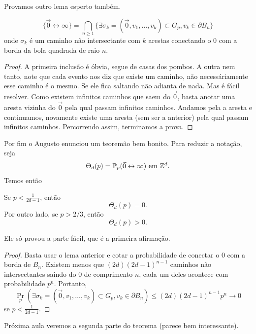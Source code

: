 Provamos outro lema esperto também.
\begin{lemma}
	\[
		\{\vec{0} \leftrightarrow \infty\} = \bigcap_{n\geq1} \{\exists
		\sigma_k = (\vec{0}, v_1, \dots, v_k) \subset G_p, v_k \in \partial B_n\}
	\]
	onde $\sigma_k$ é um caminho não intersectante com $k$
	arestas conectando o $0$ com a borda da bola quadrada de
	raio $n$.
\end{lemma}

\begin{proof}
	A primeira inclusão é óbvia, segue de casas dos pombos. A outra nem tanto,
	note que cada evento nos diz que existe um caminho, não
	necessáriamente esse caminho
	é o mesmo. Se ele fica saltando não adianta de nada. Mas é fácil
	resolver. Como existem
	infinitos caminhos que saem do $\vec{0}$, basta anotar uma aresta
	vizinha do $\vec{0}$ pela qual passam
	infinitos caminhos. Andamos pela a aresta e continuamos, novamente
	existe uma aresta (sem ser a anterior) pela
	qual passam infinitos caminhos. Percorrendo assim, terminamos a prova.
\end{proof}

Por fim o Augusto enunciou um teoremão bem bonito. Para reduzir a notação,
seja
\[
	\Theta_d(p) = \mathbb{P}_p(\vec{0} \leftrightarrow \infty) \text{ em } \mathbb{Z}^d.
\]
Temos então
\begin{theorem}
	\label{trm:bounds_for_pc}
	Se $p < \frac{1}{2d - 1}$, então
	\[\Theta_d(p) = 0.\]
	Por outro lado, se $p > 2/3$, então
	\[\Theta_d(p) > 0.\]
\end{theorem}
Ele só provou a parte fácil, que é a primeira afirmação.
\begin{proof}
	Basta usar o lema anterior e cotar a probabilidade de conectar o $0$
	com a borda de $B_n$.
	Existem menos que $(2d)(2d - 1)^{n-1}$ caminhos não intersectantes
	saindo do $0$ de comprimento $n$,
	cada um deles acontece com probabilidade $p^n$. Portanto,
	\[
		\Pr_p(\exists
			\sigma_k = (\vec{0}, v_1, \dots, v_k) \subset G_p, v_k \in \partial
		B_n) \leq (2d)(2d-1)^{n-1}p^n \to 0
	\]
	se $p < \frac{1}{2d - 1}$.
\end{proof}

Próxima aula veremos a segunda parte do teorema (parece bem interessante).
